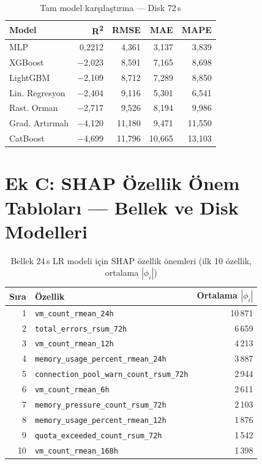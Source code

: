 \begin{ekler}
\begin{table}[htbp]
    \centering
    \caption{Tam model karşılaştırma — Disk 72\,s}
    \begin{tabular}{lrrrr}
        \textbf{Model} & \textbf{R\textsuperscript{2}} & \textbf{RMSE} & \textbf{MAE} & \textbf{MAPE} \\
        \hline
        MLP             & 0{,}2212   & 4{,}361  & 3{,}137  & 3{,}839  \\
        XGBoost         & $-$2{,}023  & 8{,}591 & 7{,}165  & 8{,}698  \\
        LightGBM        & $-$2{,}109  & 8{,}712 & 7{,}289  & 8{,}850  \\
        Lin. Regresyon  & $-$2{,}404  & 9{,}116 & 5{,}301  & 6{,}541  \\
        Rast. Orman     & $-$2{,}717  & 9{,}526 & 8{,}194  & 9{,}986  \\
        Grad. Artırmalı & $-$4{,}120  & 11{,}180 & 9{,}471 & 11{,}550 \\
        CatBoost        & $-$4{,}699  & 11{,}796 & 10{,}665 & 13{,}103 \\
    \end{tabular}
\end{table}


\section*{Ek C: SHAP Özellik Önem Tabloları — Bellek ve Disk Modelleri}

\begin{table}[htbp]
    \centering
    \caption{Bellek 24\,s LR modeli için SHAP özellik önemleri (ilk 10 özellik, ortalama $|\phi_i|$)}
    \label{tab:ek-shap-mem}
    \begin{tabular}{rlr}
        \textbf{Sıra} & \textbf{Özellik} & \textbf{Ortalama $|\phi_i|$} \\
        \hline
        1  & \texttt{vm\_count\_rmean\_24h}                   & 10\,871 \\
        2  & \texttt{total\_errors\_rsum\_72h}                &  6\,659 \\
        3  & \texttt{vm\_count\_rmean\_12h}                   &  4\,213 \\
        4  & \texttt{memory\_usage\_percent\_rmean\_24h}      &  3\,887 \\
        5  & \texttt{connection\_pool\_warn\_count\_rsum\_72h} & 2\,944 \\
        6  & \texttt{vm\_count\_rmean\_6h}                    &  2\,611 \\
        7  & \texttt{memory\_pressure\_count\_rsum\_72h}      &  2\,103 \\
        8  & \texttt{memory\_usage\_percent\_rmean\_12h}      &  1\,876 \\
        9  & \texttt{quota\_exceeded\_count\_rsum\_72h}       &  1\,542 \\
        10 & \texttt{vm\_count\_rmean\_168h}                  &  1\,398 \\
    \end{tabular}
\end{table}


\end{ekler}
